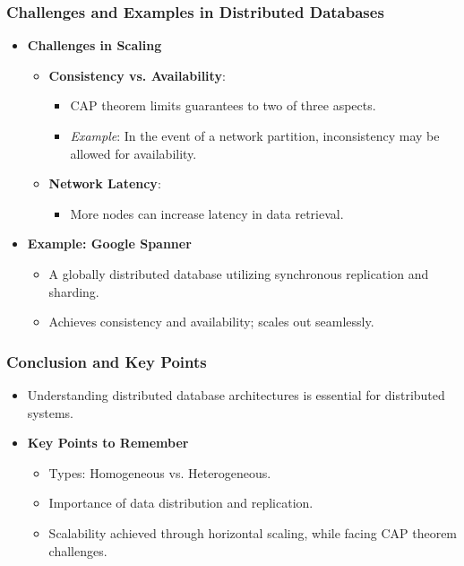 \documentclass[aspectratio=169]{beamer}
\begin{document}
\begin{frame}[fragile]
    \frametitle{Challenges and Examples in Distributed Databases}
    \begin{itemize}
        \item \textbf{Challenges in Scaling}
            \begin{itemize}
                \item \textbf{Consistency vs. Availability}:
                    \begin{itemize}
                        \item CAP theorem limits guarantees to two of three aspects.
                        \item \textit{Example}: In the event of a network partition, inconsistency may be allowed for availability.
                    \end{itemize}
                \item \textbf{Network Latency}: 
                    \begin{itemize}
                        \item More nodes can increase latency in data retrieval.
                    \end{itemize}
            \end{itemize}
        
        \item \textbf{Example: Google Spanner}
            \begin{itemize}
                \item A globally distributed database utilizing synchronous replication and sharding.
                \item Achieves consistency and availability; scales out seamlessly.
            \end{itemize}
    \end{itemize}
\end{frame}

\begin{frame}[fragile]
    \frametitle{Conclusion and Key Points}
    \begin{itemize}
        \item Understanding distributed database architectures is essential for distributed systems.
        \item \textbf{Key Points to Remember}
            \begin{itemize}
                \item Types: Homogeneous vs. Heterogeneous.
                \item Importance of data distribution and replication.
                \item Scalability achieved through horizontal scaling, while facing CAP theorem challenges.
            \end{itemize}
    \end{itemize}
\end{frame}
\end{document}
